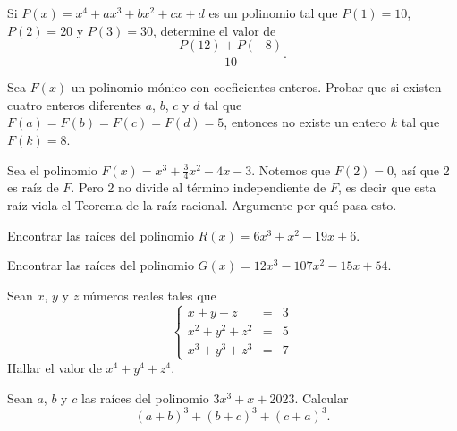 \begin{section-problem}
    Si $P(x) = x^4 + ax^3 + bx^2 + cx + d$ es un polinomio tal que $P(1) = 10$, $P(2) = 20$ y $P(3) = 30$, determine el valor de
    \[\frac{P(12) + P(-8)}{10}.\]
\end{section-problem}

\begin{section-problem}
    Sea $F(x)$ un polinomio mónico con coeficientes enteros.
    Probar que si existen cuatro enteros diferentes $a$, $b$, $c$ y $d$ tal que $F(a) = F(b) = F(c)  = F(d) = 5$,
    entonces no existe un entero $k$ tal que $F(k) = 8$.
\end{section-problem}


\begin{section-problem}
    Sea el polinomio $F(x) = x^3 + \frac{3}{4}x^2 - 4x - 3$.
    Notemos que $F(2) = 0$, así que 2 es raíz de $F$.
    Pero 2 no divide al término independiente de $F$, es decir que esta raíz viola el Teorema de la raíz racional.
    Argumente por qué pasa esto.
\end{section-problem}

\begin{section-problem}
    Encontrar las raíces del polinomio $R(x) = 6x^3 + x^2 - 19x + 6$.
\end{section-problem}

\begin{section-problem}
    Encontrar las raíces del polinomio $G(x) = 12x^3 - 107x^2 - 15x + 54$.
\end{section-problem}



\begin{section-problem}
    Sean $x$, $y$ y $z$ números reales tales que
    \[
        \left\{
        \begin{array}{rcl}
            x + y + z & =& 3\\
            x^2 + y^2 + z^2 & =& 5\\
            x^3 + y^3 + z^3 & =& 7
        \end{array}
        \right.
    \]
    Hallar el valor de $x^4 + y^4 + z^4$.
\end{section-problem}

\begin{section-problem}
    Sean $a$, $b$ y $c$ las raíces del polinomio $3x^3 + x + 2023$.
    Calcular
    \[
        (a + b)^3 + (b + c)^3 + (c + a)^3.
    \]
\end{section-problem}

